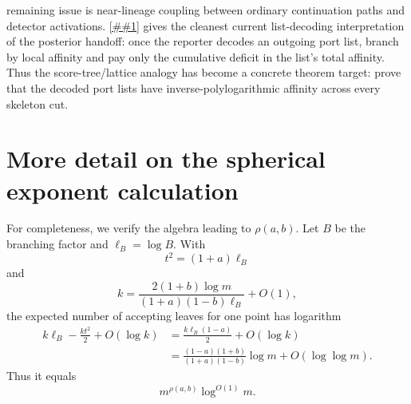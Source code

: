 \documentclass[10pt]{article}
\newcommand{\Cref}[1]{\ref{##1}}
\theoremstyle{definition}
\begin{document}
remaining issue is near-lineage coupling between ordinary continuation paths and detector activations.
\Cref{cor:affinity-proportional-route-law} gives the cleanest current
list-decoding interpretation of the posterior handoff: once the reporter
decodes an outgoing port list, branch by local affinity and pay only the
cumulative deficit in the list's total affinity.  Thus the score-tree/lattice
analogy has become a concrete theorem target: prove that the decoded port
lists have inverse-polylogarithmic affinity across every skeleton cut.

\appendix

\section{More detail on the spherical exponent calculation}

For completeness, we verify the algebra leading to $\rho(a,b)$. Let $B$ be the branching factor and $\ell_B=\log B$. With
\[
   t^2=(1+a)\ell_B
\]
and
\[
   k=
   \frac{2(1+b)\log m}
   {(1+a)(1-b)\ell_B}
   +O(1),
\]
the expected number of accepting leaves for one point has logarithm
\begin{align*}
   k\ell_B-\frac{kt^2}{2}+O(\log k)
                                                                                                                  &=
                                                                                                                  \frac{k\ell_B(1-a)}{2}+O(\log k)\\
                                                                                                                                                                                                 &=
                                                                                                                                                                                                 \frac{(1-a)(1+b)}{(1+a)(1-b)}\log m+O(\log\log m).
\end{align*}
Thus it equals
\[
   m^{\rho(a,b)}\log^{O(1)}m.
\]
\end{document}
